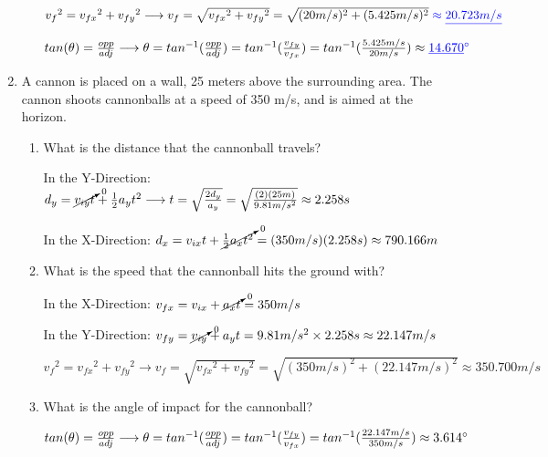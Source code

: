 \documentclass[letterpaper, 12pt]{article}
\begin{document}
\begin{enumerate}
\begin{enumerate}
	$ {v_f}^2 = {v_{fx}}^2 + {v_{fy}}^2 \longrightarrow {v_f} = \sqrt{{v_{fx}}^2 + {v_{fy}}^2} = \sqrt{(20 m/s)^2 + (5.425 m/s)^2}  \color{blue} \approx \underline{20.723 m/s}  $
	\color{red}	
	
		$tan(\theta) = \frac{opp}{adj} \longrightarrow \theta = tan^{-1}(\frac{opp}{adj}) = tan^{-1}(\frac{v_{fy}}{v_{fx}}) =  tan^{-1}(\frac{5.425 m/s}{20 m/s}) \approx \color{blue} \underline{14.670} \degree  $
	
	
	\color{black}
	
	
	
\end{enumerate}


\item A cannon is placed on a wall, 25 meters above the surrounding area.  The cannon shoots cannonballs at a speed of 350 m/s, and is aimed at the horizon.  
\begin{enumerate}
	\item What is the distance that the cannonball travels?
	\color{red}

	In the Y-Direction: $d_y = \cancelto{0}{v_{iy}t} + \frac{1}{2}a_y t^2 \longrightarrow t = \sqrt{\frac{2 d_y}{a_y}} = \sqrt{\frac{(2) (25m)}{9.81 m/s^2}} \approx 2.258 s $

In the X-Direction: $d_x = v_{ix} t + \cancelto{0}{\frac{1}{2}a_x t^2}  = (350 m/s)(2.258s) \approx 790.166 m $

\color{black}

	\item What is the speed that the cannonball hits the ground with?
	\color{red}
	
In the X-Direction: $ v_{fx} = v_{ix} + \cancelto{0}{a_x t} = 350 m/s$

In the Y-Direction: $ v_{fy} = \cancelto{0}{v_{iy}} + a_y t = 9.81 m/s^2 \times 2.258s \approx 22.147 m/s$

$ {v_f}^2 = {v_{fx}}^2 + {v_{fy}}^2 \longrightarrow {v_f} = \sqrt{{v_{fx}}^2 + {v_{fy}}^2} = \sqrt{(350 m/s)^2 + (22.147 m/s)^2} \approx 350.700 m/s  $
\color{black}


	\item What is the angle of impact for the cannonball?	
	\color{red}
	
$tan(\theta) = \frac{opp}{adj} \longrightarrow \theta = tan^{-1}(\frac{opp}{adj}) = tan^{-1}(\frac{v_{fy}}{v_{fx}}) =  tan^{-1}(\frac{22.147 m/s}{350 m/s}) \approx 3.614 \degree  $
\color{black}


\end{enumerate}



\end{enumerate}
\end{document}
